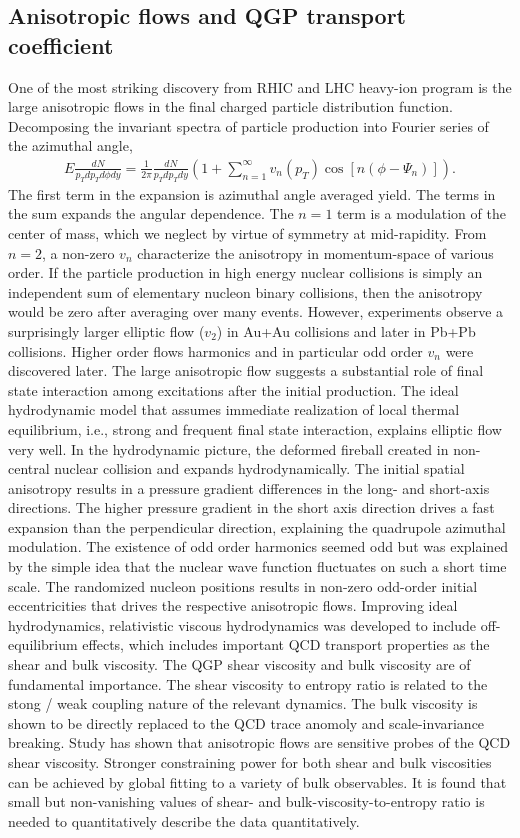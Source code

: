 \subsection{Anisotropic flows and QGP transport coefficient}
One of the most striking discovery from RHIC and LHC heavy-ion program is the large anisotropic flows in the final charged particle distribution function.
Decomposing the invariant spectra of particle production into Fourier series of the azimuthal angle,
\begin{eqnarray}
E\frac{dN}{p_T dp_T d\phi dy} = \frac{1}{2\pi}\frac{dN}{p_T dp_T dy}\left(1 + \sum_{n=1}^{\infty}v_n(p_T)\cos\left[n(\phi-\Psi_n)\right]\right).
\end{eqnarray}
The first term in the expansion is azimuthal angle averaged yield.
The terms in the sum expands the angular dependence. 
The $n=1$ term is a modulation of the center of mass, which we neglect by virtue of symmetry at mid-rapidity.
From $n=2$, a non-zero $v_n$ characterize the anisotropy in momentum-space of various order.
If the particle production in high energy nuclear collisions is simply an independent sum of elementary nucleon binary collisions, then the anisotropy would be zero after averaging over many events. 
However, experiments observe a surprisingly larger elliptic flow ($v_2$) in Au+Au collisions and later in Pb+Pb collisions.
Higher order flows harmonics and in particular odd order $v_n$ were discovered later.
The large anisotropic flow suggests a substantial role of final state interaction among excitations after the initial production.
The ideal hydrodynamic model that assumes immediate realization of local thermal equilibrium, i.e., strong and frequent final state interaction, explains elliptic flow very well.
In the hydrodynamic picture, the deformed fireball created in non-central nuclear collision and expands hydrodynamically. 
The initial spatial anisotropy results in a pressure gradient differences in the long- and short-axis directions.
The higher pressure gradient in the short axis direction drives a fast expansion than the perpendicular direction, explaining the quadrupole azimuthal modulation.
The existence of odd order harmonics seemed odd but was explained by the simple idea that the nuclear wave function fluctuates on such a short time scale. 
The randomized nucleon positions results in non-zero odd-order initial eccentricities that drives the respective anisotropic flows.
Improving ideal hydrodynamics, relativistic viscous hydrodynamics was developed to include off-equilibrium effects, which includes important QCD transport properties as the shear and bulk viscosity.
The QGP shear viscosity and bulk viscosity are of fundamental importance. 
The shear viscosity to entropy ratio is related to the stong / weak coupling nature of the relevant dynamics. 
The bulk viscosity is shown to be directly replaced to the QCD trace anomoly and scale-invariance breaking.
Study has shown that anisotropic flows are sensitive probes of the QCD shear viscosity.
Stronger constraining power for both shear and bulk viscosities can be achieved by global fitting to a variety of bulk observables.
It is found that small but non-vanishing values of shear- and bulk-viscosity-to-entropy ratio is needed to quantitatively describe the data quantitatively.

